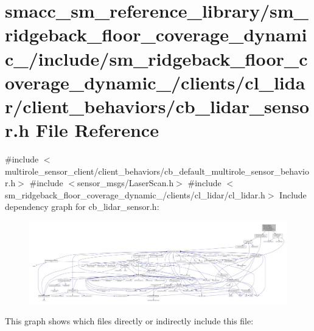 \hypertarget{sm__ridgeback__floor__coverage__dynamic__1_2include_2sm__ridgeback__floor__coverage__dynamic__1_824a2e82c5d6b1bcf408afc7c02f1486}{}\section{smacc\+\_\+sm\+\_\+reference\+\_\+library/sm\+\_\+ridgeback\+\_\+floor\+\_\+coverage\+\_\+dynamic\+\_/include/sm\+\_\+ridgeback\+\_\+floor\+\_\+coverage\+\_\+dynamic\+\_/clients/cl\+\_\+lidar/client\+\_\+behaviors/cb\+\_\+lidar\+\_\+sensor.h File Reference}
\label{sm__ridgeback__floor__coverage__dynamic__1_2include_2sm__ridgeback__floor__coverage__dynamic__1_824a2e82c5d6b1bcf408afc7c02f1486}
{\ttfamily \#include $<$multirole\+\_\+sensor\+\_\+client/client\+\_\+behaviors/cb\+\_\+default\+\_\+multirole\+\_\+sensor\+\_\+behavior.\+h$>$}\newline
{\ttfamily \#include $<$sensor\+\_\+msgs/\+Laser\+Scan.\+h$>$}\newline
{\ttfamily \#include $<$sm\+\_\+ridgeback\+\_\+floor\+\_\+coverage\+\_\+dynamic\+\_/clients/cl\+\_\+lidar/cl\+\_\+lidar.\+h$>$}\newline
Include dependency graph for cb\+\_\+lidar\+\_\+sensor.\+h\+:
\nopagebreak
\begin{figure}[H]
\begin{center}
\leavevmode
\includegraphics[width=350pt]{sm__ridgeback__floor__coverage__dynamic__1_2include_2sm__ridgeback__floor__coverage__dynamic__1_fd1ff2a3890544214e5e68afb1bde232}
\end{center}
\end{figure}
This graph shows which files directly or indirectly include this file\+:
